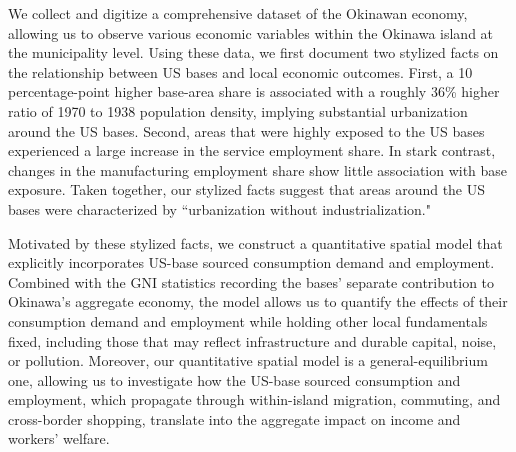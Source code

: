 \documentclass[12pt, unicode, a4paper]{article}
\newcommand{\1}{\mbox{1}\hspace{-0.25em}\mbox{l}} %
\begin{document}
We collect and digitize a comprehensive dataset of the Okinawan economy, allowing us to observe various economic variables within the Okinawa island at the municipality level. Using these data, we first document two stylized facts on the relationship between US bases and local economic outcomes. First, a 10 percentage-point higher base-area share is associated with a roughly 36\% higher ratio of 1970 to 1938 population density, implying substantial urbanization around the US bases.
Second, areas that were highly exposed to the US bases experienced a large increase in the service employment share.
In stark contrast, changes in the manufacturing employment share show little association with base exposure. Taken together, our stylized facts suggest that areas around the US bases were characterized by ``urbanization without industrialization."



Motivated by these stylized facts, we construct a quantitative spatial model that explicitly incorporates US-base sourced consumption demand and employment. 
Combined with the GNI statistics recording the bases' separate contribution to Okinawa's aggregate economy, the model allows us to quantify the effects of their consumption demand and employment while holding other local fundamentals fixed, including those that may reflect infrastructure and durable capital, noise, or pollution.
Moreover, our quantitative spatial model is a general-equilibrium one, allowing us to investigate how the US-base sourced consumption and employment, which propagate through within-island migration, commuting, and cross-border shopping, translate into the aggregate impact on income and workers' welfare.
\end{document}
